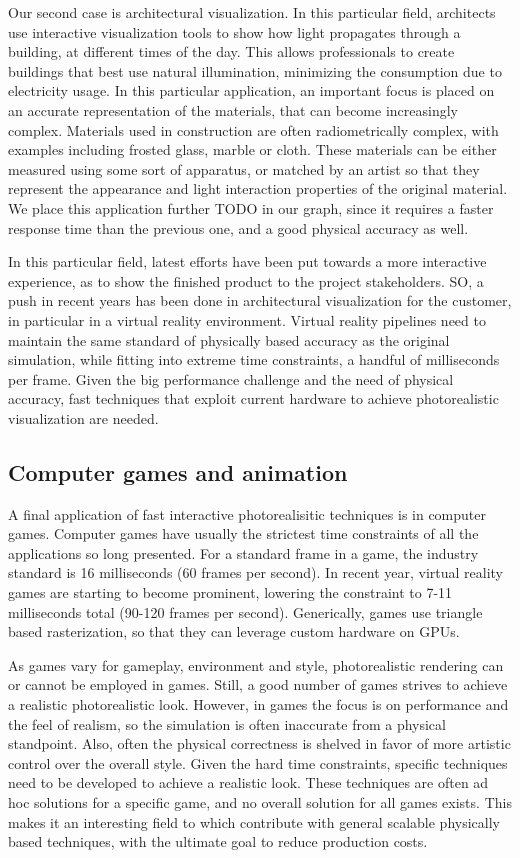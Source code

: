 Our second case is architectural visualization. In this particular field, architects use interactive visualization tools to show how light propagates through a building, at different times of the day. This allows professionals to create buildings that best use natural illumination, minimizing the consumption due to electricity usage. In this particular application, an important focus is placed on an accurate representation of the materials, that can become increasingly complex. Materials used in construction are often radiometrically complex, with examples including frosted glass, marble or cloth. These materials can be either measured using some sort of apparatus, or matched by an artist so that they represent the appearance and light interaction properties of the original material. We place this application further TODO in our graph, since it requires a faster response time than the previous one, and a good physical accuracy as well. 

In this particular field, latest efforts have been put towards a more interactive experience, as to show the finished product to the project stakeholders. SO, a push in recent years has been done in architectural visualization for the customer, in particular in a virtual reality environment. Virtual reality pipelines need to maintain the same standard of physically based accuracy as the original simulation, while fitting into extreme time constraints, a handful of milliseconds per frame. Given the big performance challenge and the need of physical accuracy, fast techniques that exploit current hardware to achieve photorealistic visualization are needed.

\subsection{Computer games and animation}

A final application of fast interactive photorealisitic techniques is in computer games. Computer games have usually the strictest time constraints of all the applications so long presented. For a standard frame in a game, the industry standard is 16 milliseconds (60 frames per second). In recent year, virtual reality games are starting to become prominent, lowering the constraint to 7-11 milliseconds total (90-120 frames per second). Generically, games use triangle based rasterization, so that they can leverage custom hardware on GPUs. 

As games vary for gameplay, environment and style, photorealistic rendering can or cannot be employed in games. Still, a good number of games strives to achieve a realistic photorealistic look. However, in games the focus is on performance and the feel of realism, so the simulation is often inaccurate from a physical standpoint. Also, often the physical correctness is shelved in favor of more artistic control over the overall style. Given the hard time constraints, specific techniques need to be developed to achieve a realistic look. These techniques are often ad hoc solutions for a specific game, and no overall solution for all games exists. This makes it an interesting field to which contribute with general scalable physically based techniques, with the ultimate goal to reduce production costs.

